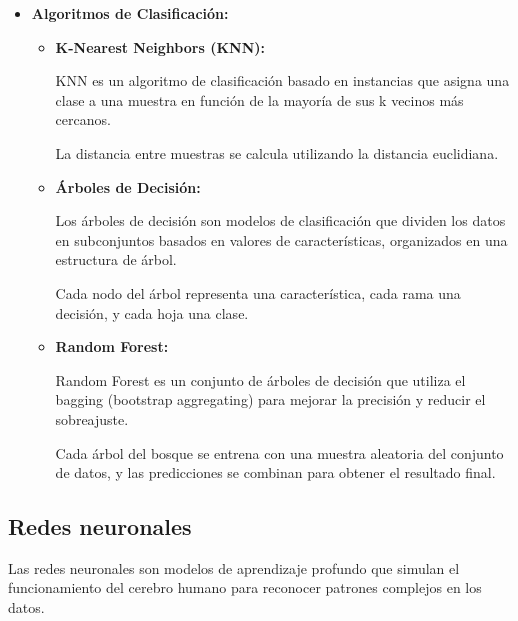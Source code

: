 \begin{itemize}
	
\item
\textbf{Algoritmos de Clasificación:}	
	
	\begin{itemize}
	
	\item
	\textbf{K-Nearest Neighbors (KNN):}
	
	KNN es un algoritmo de clasificación basado en instancias que asigna una clase a una muestra en función de la mayoría de sus k vecinos más cercanos.
	
	La distancia entre muestras se calcula utilizando la distancia euclidiana.
	
	
	

	\item
	\textbf{Árboles de Decisión:}	
	
	Los árboles de decisión son modelos de clasificación que dividen los datos en subconjuntos basados en valores de características, organizados en una estructura de árbol.
	
	Cada nodo del árbol representa una característica, cada rama una decisión, y cada hoja una clase.
	

	
	

	\item
	\textbf{Random Forest:}	
	
	Random Forest es un conjunto de árboles de decisión que utiliza el bagging (bootstrap aggregating) para mejorar la precisión y reducir el sobreajuste.
	
	Cada árbol del bosque se entrena con una muestra aleatoria del conjunto de datos, y las predicciones se combinan para obtener el resultado final.
	
	

	\end{itemize}
\end{itemize}
	

\subsection{Redes neuronales}

	
	
Las redes neuronales son modelos de aprendizaje profundo que simulan el funcionamiento del cerebro humano para reconocer patrones complejos en los datos.


